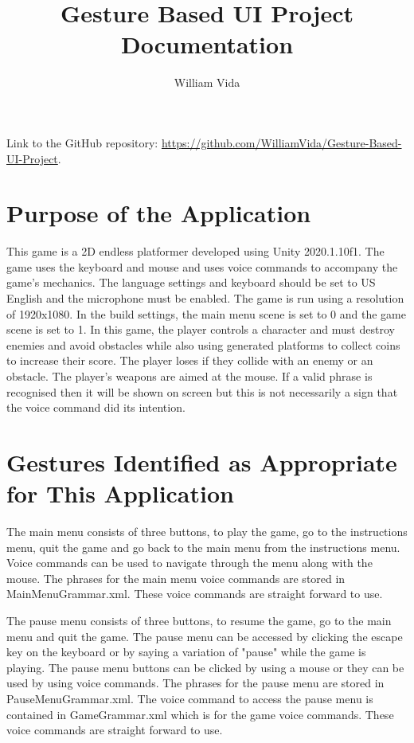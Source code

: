 \documentclass{article}
\title{Gesture Based UI Project Documentation}
\author{William Vida}
\date{}
\begin{document}
\maketitle

Link to the GitHub repository: \url{https://github.com/WilliamVida/Gesture-Based-UI-Project}.

\tableofcontents

\newpage

\section{Purpose of the Application}
This game is a 2D endless platformer developed using Unity 2020.1.10f1. The game uses the keyboard and mouse and uses voice commands to accompany the game's mechanics. The language settings and keyboard should be set to US English and the microphone must be enabled. The game is run using a resolution of 1920x1080. In the build settings, the main menu scene is set to 0 and the game scene is set to 1. In this game, the player controls a character and must destroy enemies and avoid obstacles while also using generated platforms to collect coins to increase their score. The player loses if they collide with an enemy or an obstacle. The player's weapons are aimed at the mouse. If a valid phrase is recognised then it will be shown on screen but this is not necessarily a sign that the voice command did its intention.

\section{Gestures Identified as Appropriate for This Application}
The main menu consists of three buttons, to play the game, go to the instructions menu, quit the game and go back to the main menu from the instructions menu. Voice commands can be used to navigate through the menu along with the mouse. The phrases for the main menu voice commands are stored in MainMenuGrammar.xml. These voice commands are straight forward to use.

The pause menu consists of three buttons, to resume the game, go to the main menu and quit the game. The pause menu can be accessed by clicking the escape key on the keyboard or by saying a variation of "pause" while the game is playing. The pause menu buttons can be clicked by using a mouse or they can be used by using voice commands. The phrases for the pause menu are stored in PauseMenuGrammar.xml. The voice command to access the pause menu is contained in GameGrammar.xml which is for the game voice commands. These voice commands are straight forward to use.
\end{document}

